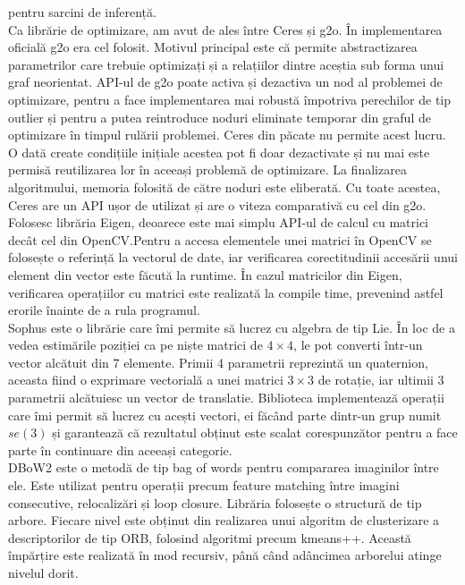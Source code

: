\documentclass[12pt,a4paper]{report}
\begin{document}
pentru sarcini de inferență.  \\
Ca librărie de optimizare, am avut de ales între Ceres și g2o\cite{g2oLibrary}. În implementarea oficială 
g2o era cel folosit. Motivul principal este că permite abstractizarea parametrilor care 
trebuie optimizați și a relațiilor dintre aceștia sub forma unui graf neorientat. 
API-ul de g2o poate activa și dezactiva un nod al problemei de optimizare, pentru a face implementarea 
mai robustă împotriva perechilor de tip outlier și pentru a putea reintroduce noduri eliminate
temporar din graful de optimizare în timpul rulării problemei. Ceres din păcate nu permite acest lucru.
O dată create condițiile inițiale acestea pot fi doar dezactivate și nu mai este permisă reutilizarea lor în 
aceeași problemă de optimizare. La finalizarea algoritmului, memoria folosită de către noduri este eliberată.
Cu toate acestea, Ceres are un API ușor de utilizat și are o viteza comparativă cu cel din g2o.\\
Folosesc librăria Eigen, deoarece este mai simplu API-ul de calcul cu matrici decât 
cel din OpenCV.\@ Pentru a accesa elementele unei matrici în OpenCV se folosește o referință la 
vectorul de date, iar verificarea corectitudinii accesării unui element din vector este făcută la runtime.
În cazul matricilor din Eigen, verificarea operațiilor cu matrici este realizată la compile time, prevenind
astfel erorile înainte de a rula programul. \\
Sophus este o librărie care îmi permite să lucrez cu algebra de tip Lie. În loc de a vedea
estimările poziției ca pe niște matrici de $ 4 \times 4 $, le pot converti într-un vector alcătuit din 7 
elemente. Primii 4 parametrii reprezintă un quaternion, aceasta fiind o exprimare vectorială 
a unei matrici $ 3 \times 3 $ de rotație, iar ultimii 3 parametrii alcătuiesc un vector de translatie.
Biblioteca implementează operații care îmi permit să lucrez cu acești vectori, ei făcând parte 
dintr-un grup numit \(se(3)\) și garantează că rezultatul obținut este scalat corespunzător 
pentru a face parte în continuare din aceeași categorie. \\
DBoW2 este o metodă de tip bag of words pentru compararea imaginilor între ele. Este utilizat
pentru operații precum feature matching între imagini consecutive, relocalizări și loop closure.
Librăria folosește o structură de tip arbore. Fiecare nivel este obținut
din realizarea unui algoritm de clusterizare a descriptorilor de tip ORB, folosind algoritmi precum
kmeans++. Această împărțire este realizată în mod recursiv, până când adâncimea arborelui atinge nivelul dorit.
\end{document}
